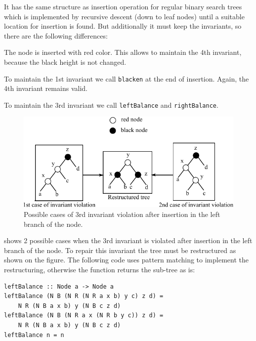 \documentclass{tmr}
\begin{document}
It has the same structure as insertion operation for regular binary search trees which is implemented by recursive descent (down to leaf nodes) until a suitable location for insertion is found. But additionally it must keep the invariants, so there are the following differences:

\begin{longitem}
\item The node is inserted with red color. This allows to maintain the 4th invariant, because the black height is not changed.
\item To maintain the 1st invariant we call \verb|blacken| at the end of insertion. Again, the 4th invariant remains valid.
\item To maintain the 3rd invariant we call \verb|leftBalance| and \verb|rightBalance|.
\end{longitem}
 
\begin{figure}
\centering
\includegraphics{balancing}
\vspace{5pt}
\caption{Possible cases of 3rd invariant violation after insertion in the left branch of the node.}
\label{fig:balancing}
\end{figure}

 shows 2 possible cases when the 3rd invariant is violated after insertion in the left branch of the node. To repair this invariant the tree must be restructured as shown on the figure. The following code uses pattern matching to implement the restructuring, otherwise the function returns the sub-tree as is:

\begin{Verbatim}
leftBalance :: Node a -> Node a
leftBalance (N B (N R (N R a x b) y c) z d) =
    N R (N B a x b) y (N B c z d)
leftBalance (N B (N R a x (N R b y c)) z d) =
    N R (N B a x b) y (N B c z d)
leftBalance n = n
\end{Verbatim}
\end{document}
